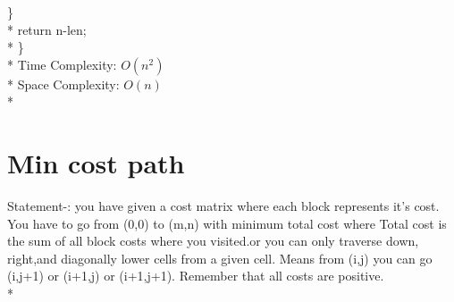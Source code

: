 \documentclass[12pt]{book}
\begin{document}
\phantom{x} \hspace{3ex}    \} \\*
\phantom{x} \hspace{3ex}return n-len; \\*
\} \\*
\newline
Time Complexity:
$O(n^2)$ \\*
Space Complexity:
$O(n)$ \\*
\newline
\newline
\chapter{Min cost path}
Statement-: you have given a cost matrix where each block represents it’s cost. You have to go from (0,0) to (m,n) with minimum total cost where
Total cost is the sum of all block costs where you visited.or you can only traverse down, right,and diagonally lower cells from a given cell. Means from (i,j) you can go (i,j+1) or (i+1,j) or (i+1,j+1). Remember that all costs are positive. \\*
\newline
\end{document}
